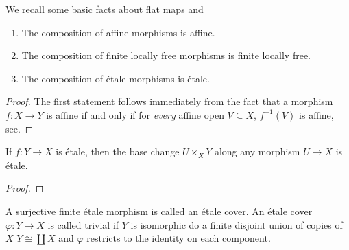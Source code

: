 We recall some basic facts about flat maps and
\begin{lemma}
	\begin{enumerate}
		\item The composition of affine morphisms is affine.
		\item The composition of finite locally free morphisms is finite locally free.
		\item The composition of \'etale morphisms is \'etale.
	\end{enumerate}
\end{lemma}

\begin{proof}
	The first statement follows immediately from the fact that a morphism $f: X \to Y$ is affine if and only if for \textit{every} affine open $V \subseteq X$, $f^{-1}(V)$ is affine, see\cite{Hartshorne}.
\end{proof}

\begin{lemma}
	If $f: Y \to X$ is \'etale, then the base change $U \times_X Y$ along any morphism $U \to X$ is \'etale.
\end{lemma}

\begin{proof}

\end{proof}

\begin{definition}
	A surjective finite \'etale morphism is called an \'etale cover. An \'etale cover $\varphi : Y \to X$ is called trivial if $Y$ is isomorphic do a finite disjoint union of copies of $X$ $Y \cong \coprod X$ and $\varphi$ restricts to the identity on each component.
\end{definition}

